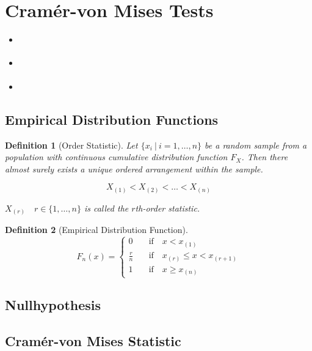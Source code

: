 \documentclass[11pt,twoside,a4paper]{article}
\theoremstyle{MAstyle} \newtheorem{assumption}{Assumption}
\theoremstyle{MAstyle} \newtheorem{definition}{Definition}
\begin{document}
	\section{Cram\'{e}r-von Mises Tests}\label{CvM_Tests}
		\begin{itemize}
			\item \cite{darling_kolmogorov-smirnov_1957}
			\item \cite{anderson_asymptotic_1952}
			\item \cite{buning_nichtparametrische_2013}
		\end{itemize}
	
		\subsection{Empirical Distribution Functions}
			
			\cite{gibbons_nonparametric_2021}
			\begin{definition}[Order Statistic]
				
				Let $\{x_i \: \vert \: i = 1, \dots , n\}$ be a random sample from a population with continuous cumulative distribution function $F_X$. Then there almost surely exists a unique ordered arrangement within the sample. 
				
				$$X_{(1)} < X_{(2)} < \dots < X_{(n)}$$
				
				$X_{(r)} \quad r \in \{1, \dots, n\}$ is called the $r$th-order statistic.	
			\end{definition}
		
			\begin{definition}[Empirical Distribution Function]
				\begin{equation}
					F_{n}(x) = \begin{cases}
						0 & \quad \text{if} \quad  x < x_{(1)} \\
						\frac{r}{n} & \quad \text{if} \quad  x_{(r)} \leq x < x_{(r + 1)} \\
						1 & \quad \text{if} \quad  x \geq x_{(n)}
					\end{cases}
				\end{equation}
			\end{definition}
		
		\subsection{Nullhypothesis}
		
		\subsection{Cram\'{e}r-von Mises Statistic}
			
\end{document}
